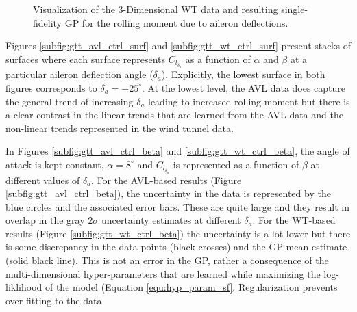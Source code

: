 \begin{figure}
    \centering
    \begin{subfigure}[\label{subfig:gtt_wt_ctrl_surf}3-Dimensional function in $\alpha$, $\beta$, and $\delta_a$] {
        \texttt{[image: code/image\_gen/gmatt/1f/wt/images/gps/CRMAIL.png]} }
    \end{subfigure}
    \hfill
    \begin{subfigure}[\label{subfig:gtt_wt_ctrl_beta}Variation in $\beta$ at $\alpha=8^\circ$]{
        \texttt{[image: code/image\_gen/gmatt/1f/wt/images/gps/CRMAIL\_alpha=8.png]}
    }
    \end{subfigure}
    \hfill
    \begin{subfigure}[\label{subfig:gtt_wt_ctrl_alpha}Variation in $\alpha$ at $\beta=4^\circ$]{
        \texttt{[image: code/image\_gen/gmatt/1f/wt/images/gps/CRMAIL\_beta=4.png]} 
    }
    \end{subfigure}
    \hfill
    \begin{subfigure}[\label{subfig:gtt_wt_ctrl_defl}Variation in $\delta_a$ at $\alpha = 8^\circ$ and $\beta=4^\circ$]{
        \texttt{[image: code/image\_gen/gmatt/1f/wt/images/gps/CRMAIL\_alpha=8\_beta=4.png]} 
    }
    \end{subfigure}
    \caption{Visualization of the 3-Dimensional WT data and resulting single-fidelity GP for the rolling moment due to aileron deflections. \label{fig:gtt_wt_ctrl_gps}}
\end{figure}

Figures \ref{subfig:gtt_avl_ctrl_surf} and \ref{subfig:gtt_wt_ctrl_surf} present stacks of surfaces where each surface represents $C_{l_{\delta_a}}$ as a function of $\alpha$ and $\beta$ at a particular aileron deflection angle ($\delta_a$).
Explicitly, the lowest surface in both figures corresponds to $\delta_a = -25^\circ$.
At the lowest level, the AVL data does capture the general trend of increasing $\delta_a$ leading to increased rolling moment but there is a clear contrast in the linear trends that are learned from the AVL data and the non-linear trends represented in the wind tunnel data. 

In Figures \ref{subfig:gtt_avl_ctrl_beta} and \ref{subfig:gtt_wt_ctrl_beta}, the angle of attack is kept constant, $\alpha = 8^\circ$ and $C_{l_{\delta_a}}$ is represented as a function of $\beta$ at different values of $\delta_a$. 
For the AVL-based results (Figure \ref{subfig:gtt_avl_ctrl_beta}), the uncertainty in the data is represented by the blue circles and the associated error bars.
These are quite large and they result in overlap in the gray $2\sigma$ uncertainty estimates at different $\delta_a$. 
For the WT-based results (Figure \ref{subfig:gtt_wt_ctrl_beta}) the uncertainty is a lot lower but there is some discrepancy in the data points (black crosses) and the GP mean estimate (solid black line).
This is not an error in the GP, rather a consequence of the multi-dimensional hyper-parameters that are learned while maximizing the log-liklihood of the model (Equation \ref{equ:hyp_param_sf}. 
Regularization prevents over-fitting to the data. 

